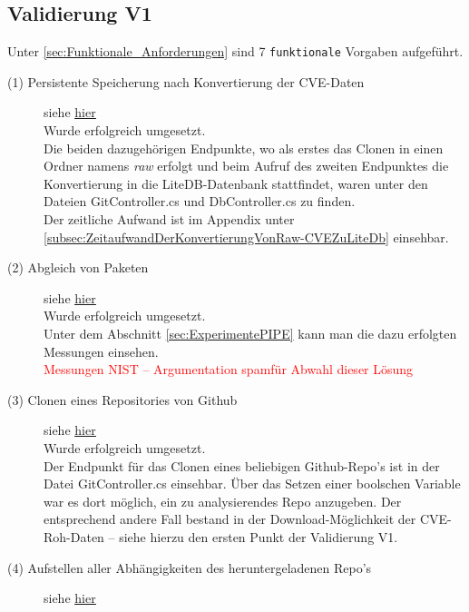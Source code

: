 \subsection{Validierung V1} \label{sec:Vali1}
    Unter \ref{sec:Funktionale_Anforderungen}  sind 7 \texttt{funktionale} Vorgaben aufgeführt.

    \begin{description}
        \item[(1) Persistente Speicherung nach Konvertierung der \ac{CVE}-Daten] siehe \hyperref[f:one]{\underline{hier}} \hfill \\
            Wurde erfolgreich umgesetzt.
            \\
            Die beiden dazugehörigen Endpunkte, wo als erstes das Clonen in einen Ordner namens \textit{raw} erfolgt und beim Aufruf des zweiten Endpunktes die Konvertierung in die LiteDB-Datenbank stattfindet, waren unter den Dateien GitController.cs und DbController.cs zu finden.
            \\
            Der zeitliche Aufwand ist im Appendix unter \ref{subsec:ZeitaufwandDerKonvertierungVonRaw-CVEZuLiteDb} einsehbar.
        \item[(2) Abgleich von Paketen] siehe \hyperref[f:two]{\underline{hier}} \hfill \\
            Wurde erfolgreich umgesetzt.
            \\
            Unter dem Abschnitt \ref{sec:ExperimentePIPE}  kann man die dazu erfolgten Messungen einsehen.
            \\
            \textcolor{red}{Messungen NIST -- Argumentation \glqq spam\grqq für Abwahl dieser Lösung}
        \item[(3) Clonen eines Repositories von Github] siehe \hyperref[f:three]{\underline{hier}} \hfill \\
            Wurde erfolgreich umgesetzt.
            \\
            Der Endpunkt für das Clonen eines beliebigen Github-Repo's ist in der Datei GitController.cs einsehbar.
            Über das Setzen einer boolschen Variable war es dort möglich, ein zu analysierendes Repo anzugeben.
            Der entsprechend andere Fall bestand in der Download-Möglichkeit der \ac{CVE}-Roh-Daten -- siehe hierzu den ersten Punkt der Validierung V1.
        \item[(4) Aufstellen aller Abhängigkeiten des heruntergeladenen Repo's] siehe \hyperref[f:four]{\underline{hier}} \hfill \\

\end{description}
